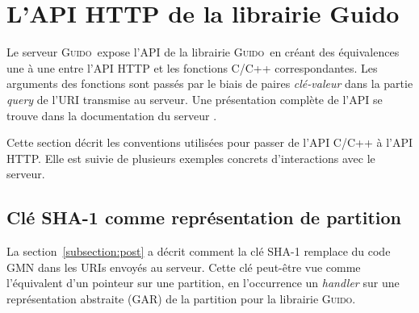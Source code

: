 \documentclass{article}
\newcommand{\guido}		{\textsc{Guido}}
\begin{document}

\section{L'API HTTP de la librairie Guido}\label{section:guido-api}
Le serveur \guido\ expose l'API de la librairie \guido\ en créant des équivalences une à une entre l'API HTTP et les fonctions C/C++ correspondantes. Les arguments des fonctions sont passés par le biais de paires \emph{clé-valeur} dans la partie \emph{query} de l'URI transmise au serveur. Une présentation complète de l'API se trouve dans la documentation du serveur \cite{guidoweb0.50}.\par

Cette section décrit les conventions utilisées pour passer de l'API C/C++ à l'API HTTP. Elle est suivie de plusieurs exemples concrets d'interactions avec le serveur. 

\subsection{Clé SHA-1 comme représentation de partition}
La section~\ref{subsection:post} a décrit comment la clé SHA-1 remplace du code GMN dans les URIs envoyés au serveur. Cette clé peut-être vue comme l'équivalent d'un pointeur sur une partition, en l'occurrence un \emph{handler} sur une représentation abstraite (GAR) de la partition pour la librairie \guido .

\end{document}
